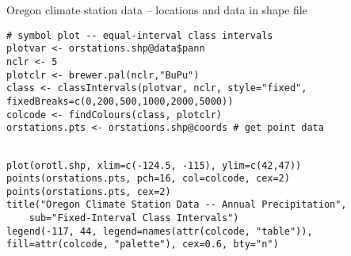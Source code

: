 \documentclass[12pt]{report}
\begin{document}
Oregon climate station data -- locations and data in shape file
\begin{framed}
\begin{verbatim}
# symbol plot -- equal-interval class intervals
plotvar <- orstations.shp@data$pann
nclr <- 5
plotclr <- brewer.pal(nclr,"BuPu")
class <- classIntervals(plotvar, nclr, style="fixed",
fixedBreaks=c(0,200,500,1000,2000,5000))
colcode <- findColours(class, plotclr)
orstations.pts <- orstations.shp@coords # get point data
\end{verbatim}
\end{framed}
\begin{framed}
\begin{verbatim}

plot(orotl.shp, xlim=c(-124.5, -115), ylim=c(42,47))
points(orstations.pts, pch=16, col=colcode, cex=2)
points(orstations.pts, cex=2)
title("Oregon Climate Station Data -- Annual Precipitation",
    sub="Fixed-Interval Class Intervals")
legend(-117, 44, legend=names(attr(colcode, "table")),
fill=attr(colcode, "palette"), cex=0.6, bty="n")

\end{verbatim}
\end{framed}
\end{document}
